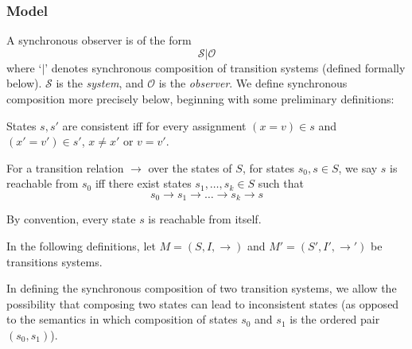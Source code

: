 \documentclass{llncs/llncs}
\newcommand{\lee}[1]{ } %
\newcommand{\lee}[1]{ {\color{blue}$<$lee: #1$>$} } %
\begin{document}
\lee{what we have defined are actually strictly stronger than synchronous observers since they can modify state.}

\subsubsection{Model}
A synchronous observer is of the form
$$\mathcal{S} | \mathcal{O}$$
\noindent
where `$|$' denotes synchronous composition of transition systems (defined formally below). $\mathcal{S}$ is the \emph{system}, and $\mathcal{O}$ is the \emph{observer}. We define synchronous composition more precisely below, beginning with some preliminary definitions:

\begin{definition}
  States $s, s'$ are consistent iff for every assignment $(x = v) \in s$ and $(x' =
  v') \in s'$, $x \neq x'$ or $v = v'$.
\end{definition}

\begin{definition}
For a transition relation $\rightarrow$ over the states of $S$, for states $s_0,  s \in S$, we say $s$ is reachable from $s_0$ iff there exist states $s_1, \ldots, s_k \in S$ such that
$$s_0 \rightarrow s_1 \rightarrow \ldots \rightarrow s_k \rightarrow s$$
\end{definition}
\noindent
By convention, every state $s$ is reachable from itself.

In the following definitions, let
$M = (S, I, \rightarrow)$
and
$M' = (S', I', \rightarrow')$
be transitions systems.


In defining the synchronous composition of two transition systems, we allow the possibility that composing two states can lead to inconsistent states (as opposed to the semantics in which composition of states $s_0$ and $s_1$ is the ordered pair $(s_0, s_1)$).
\end{document}
